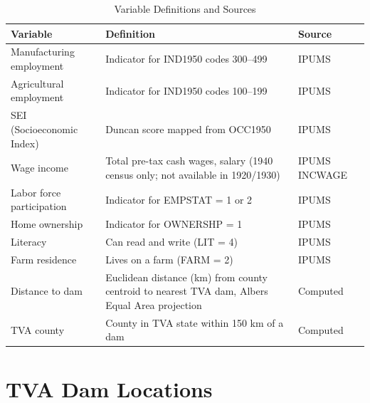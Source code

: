 \documentclass[12pt]{article}
\begin{document}
\begin{table}[htbp]
\centering
\caption{Variable Definitions and Sources}
\label{tab:variables}
\footnotesize
\begin{tabular}{p{3.5cm}p{8cm}p{3cm}}
\toprule
Variable & Definition & Source \\
\midrule
Manufacturing employment & Indicator for IND1950 codes 300--499 & IPUMS \\
Agricultural employment & Indicator for IND1950 codes 100--199 & IPUMS \\
SEI (Socioeconomic Index) & Duncan score mapped from OCC1950 & IPUMS \\
Wage income & Total pre-tax cash wages, salary (1940 census only; not available in 1920/1930) & IPUMS INCWAGE \\
Labor force participation & Indicator for EMPSTAT = 1 or 2 & IPUMS \\
Home ownership & Indicator for OWNERSHP = 1 & IPUMS \\
Literacy & Can read and write (LIT = 4) & IPUMS \\
Farm residence & Lives on a farm (FARM = 2) & IPUMS \\
Distance to dam & Euclidean distance (km) from county centroid to nearest TVA dam, Albers Equal Area projection & Computed \\
TVA county & County in TVA state within 150 km of a dam & Computed \\
\bottomrule
\end{tabular}
\end{table}


\section{TVA Dam Locations}\label{app:dams}
\end{document}
